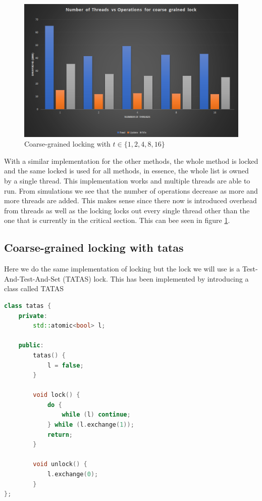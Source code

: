 \begin{figure}
    \centering
    \includegraphics[width=\linewidth]{Figures/coarsegrained.png}
    \caption{Coarse-grained locking with $t \in \{1, 2, 4, 8, 16\}$}
    \label{fig:coarsegrained}
\end{figure}

With a similar implementation for the other methods, the whole method is locked
and the same locked is used for all methods, in essence, the whole list is owned
by a single thread. This implementation works and multiple threads are able to 
run. From simulations we see that the number of operations decrease as more and
more threads are added. This makes sense since there now is introduced overhead
from threads as well as the locking locks out every single thread other than 
the one that is currently in the critical section. This can bee seen in figure
\ref{fig:coarsegrained}.

\subsection{Coarse-grained locking with tatas}
Here we do the same implementation of locking but the lock we will use is a
Test-And-Test-And-Set (TATAS) lock. This has been implemented by introducing a 
class called TATAS

\begin{lstlisting}[language=C++, caption=TATAS Class, label=listing:tatas]
class tatas {
	private:
		std::atomic<bool> l;

	public:
		tatas() {
			l = false;
		}

		void lock() {
			do {
				while (l) continue;
			} while (l.exchange(1));
			return;
		}

		void unlock() {
			l.exchange(0);
		}
};
\end{lstlisting}

